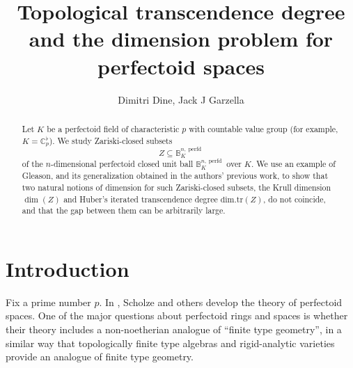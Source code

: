 

\newcommand{\dimtr}{\mathrm{dim.tr}}
\newcommand{\Frac}{\mathrm{Frac}}
\newcommand{\perfd}{\operatorname{perfd}}
\newcommand{\spc}{\mathrm{sp}}

\providecommand{\trdeg}{\operatorname{tr.deg}}
\providecommand{\toptrdeg}{\operatorname{top.tr.deg}}
\providecommand{\Toptrdeg}{\operatorname{Top.tr.deg}}
\providecommand{\trc}{\operatorname{tr.c}}




\title{Topological transcendence degree and the dimension problem for perfectoid spaces}
\author{Dimitri Dine, Jack J Garzella}
\maketitle

\begin{abstract}
    
    Let $K$ be a perfectoid field of characteristic $p$ with countable value group (for example, $K=\mathbb{C}_{p}^{\flat}$). We study Zariski-closed subsets \begin{equation*}Z\subseteq \mathbb{B}_{K}^{n,\perfd}\end{equation*}of the $n$-dimensional perfectoid closed unit ball $\mathbb{B}_{K}^{n,\perfd}$ over $K$. We use an example of Gleason, and its generalization obtained in the authors' previous work, to show that two natural notions of dimension for such Zariski-closed subsets, the Krull dimension $\dim(Z)$ and Huber's iterated transcendence degree $\dimtr(Z)$, do not coincide, and that the gap between them can be arbitrarily large. 
\end{abstract}

\section{Introduction}

Fix a prime number $p$. In \cite{Scholze, Fontaine, kedlaya-liu-2015-relative-p-adic, Kedlaya-Liu2, fargues-scholze-2021-geometrization, Diamonds}, Scholze and others develop the
theory of perfectoid spaces. One of the major questions about perfectoid rings and spaces is whether their theory includes
a non-noetherian analogue of ``finite type geometry'', in a similar way that
topologically finite type algebras and rigid-analytic varieties provide an analogue of finite type geometry.

